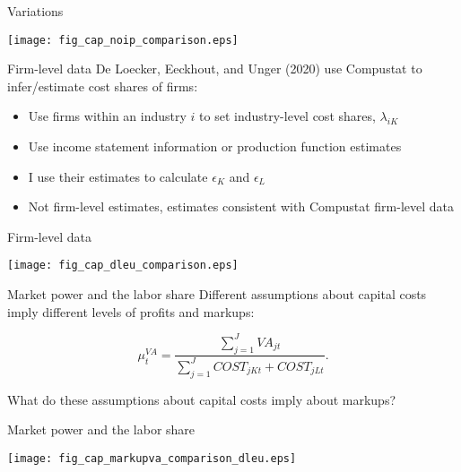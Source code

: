 \documentclass[10pt,xcolor=dvipsnames]{beamer}
\begin{document}
\begin{frame}{Variations}
\begin{center}
\texttt{[image: fig\_cap\_noip\_comparison.eps]}
\end{center}
\end{frame}


\begin{frame}{Firm-level data}\label{Sfirm}
De Loecker, Eeckhout, and Unger (2020) use Compustat to infer/estimate cost shares of firms: 

\begin{itemize}
  \item Use firms within an industry $i$ to set industry-level cost shares, $\lambda_{iK}$
  \item Use income statement information or production function estimates
  \item I use their estimates to calculate $\epsilon_K$ and $\epsilon_L$
  \item Not firm-level estimates, estimates consistent with Compustat firm-level data
\end{itemize}

\vspace{.25in} \hfill \hyperlink{Afirm}{}
\end{frame}

\begin{frame}{Firm-level data}
\begin{center}
\texttt{[image: fig\_cap\_dleu\_comparison.eps]}
\end{center}
\end{frame}

\begin{frame}{Market power and the labor share}
Different assumptions about capital costs imply different levels of profits and markups:

\begin{equation}
    \mu^{VA}_{t} = \frac{\sum_{j=1}^{J} VA_{jt}}{\sum_{j=1}^J COST_{jKt} + COST_{jLt}}. \label{EQ_markup}
\end{equation}

What do these assumptions about capital costs imply about markups?

\end{frame}

\begin{frame}{Market power and the labor share}
\begin{center}
\texttt{[image: fig\_cap\_markupva\_comparison\_dleu.eps]}
\end{center}
\end{frame}
\end{document}
